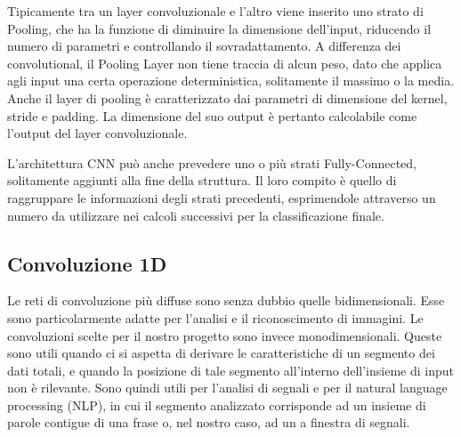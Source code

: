 \documentclass{article}
\begin{document}
Tipicamente tra un layer convoluzionale e l'altro viene inserito uno strato di Pooling, che ha la funzione di diminuire la dimensione dell'input, riducendo il numero di parametri e controllando il sovradattamento. A differenza dei convolutional, il Pooling Layer non tiene traccia di alcun peso, dato che applica agli input una certa operazione deterministica, solitamente il massimo o la media.
Anche il layer di pooling è caratterizzato dai parametri di dimensione del kernel, stride e padding. La dimensione del suo output è pertanto calcolabile come l'output del layer convoluzionale.

L'architettura CNN può anche prevedere uno o più strati Fully-Connected, solitamente aggiunti alla fine della struttura. Il loro compito è quello di raggruppare le informazioni degli strati precedenti, esprimendole attraverso un numero da utilizzare nei calcoli successivi per la classificazione finale. 

\subsection{Convoluzione 1D}
Le reti di convoluzione più diffuse sono senza dubbio quelle bidimensionali. Esse sono particolarmente adatte per l'analisi e il riconoscimento di immagini. Le convoluzioni scelte per il nostro progetto sono invece monodimensionali. Queste sono utili quando ci si aspetta di derivare le caratteristiche di un segmento dei dati totali, e quando la posizione di tale segmento all'interno dell'insieme di input non è rilevante. Sono quindi utili per l'analisi di segnali e per il natural language processing (NLP), in cui il segmento analizzato corrisponde ad un insieme di parole contigue di una frase o, nel nostro caso, ad un a finestra di segnali.
\end{document}
